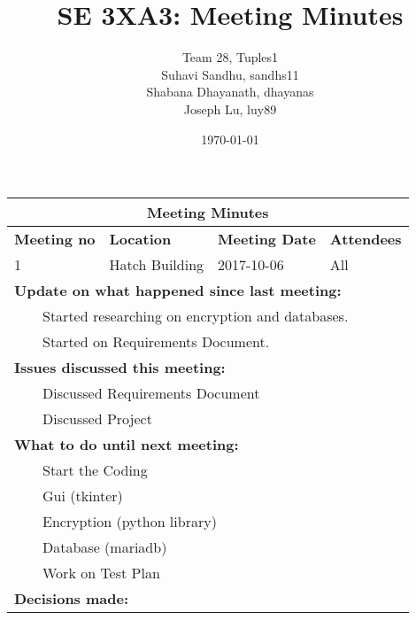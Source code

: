 \documentclass{article}
\title{SE 3XA3: Meeting Minutes}
\author{Team 28, Tuples1
		\\ Suhavi Sandhu, sandhs11
		\\ Shabana Dhayanath, dhayanas
		\\ Joseph Lu, luy89
}
\date{\today}
\newcommand{\tabitem}{~~\llap{\textbullet}~~}
\begin{document}
\begin{tabularx}{\textwidth}{ |X||X||X||X| }
    \hline
    \hline
        \multicolumn{4}{|c|}{\textbf{Meeting Minutes}} \\ 
    \hline
    \hline

    \textbf{Meeting no} & \textbf{Location} & \textbf{Meeting Date} & \textbf{Attendees}\\
    \hline

    1 & Hatch Building & 2017-10-06 & All\\

    \hline

    \multicolumn{4}{|l|}{\textbf{Update on what happened since last meeting: }} \\
		
	\multicolumn{4}{|l|}{\tabitem Started researching on encryption and databases.}\\
	\multicolumn{4}{|l|}{\tabitem Started on Requirements Document.}\\

    \hline
    
    \multicolumn{4}{|l|}{\textbf{Issues discussed this meeting: }}\\

    \multicolumn{4}{|l|}{\tabitem Discussed Requirements Document}\\
    \multicolumn{4}{|l|}{\tabitem Discussed Project}\\ 

    \hline

    \multicolumn{4}{|l|}{\textbf{What to do until next meeting: }} \\

    \multicolumn{4}{|l|}{\tabitem Start the Coding}\\
	    \multicolumn{4}{|l|}{\quad\tabitem Gui (tkinter)}\\
		\multicolumn{4}{|l|}{\quad\tabitem Encryption (python library)}\\
		\multicolumn{4}{|l|}{\quad\tabitem Database (mariadb)}\\
	\multicolumn{4}{|l|}{\tabitem Work on Test Plan}\\

    \hline
        \multicolumn{4}{|l|}{\textbf{Decisions made: }} \\
    \hline
\end{tabularx}
\end{document}
